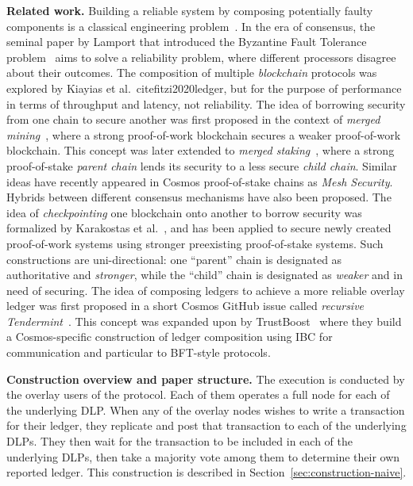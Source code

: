 \noindent
\textbf{Related work.} Building a reliable system by composing potentially faulty components
is a classical engineering problem~\cite{von1956probabilistic,moore1956reliable}.
In the era of consensus, the seminal
paper by Lamport that introduced the Byzantine Fault Tolerance problem~\cite{shostak1982byzantine}
aims to solve a reliability problem, where different processors disagree about their
outcomes. The composition of multiple \emph{blockchain} protocols was explored by
Kiayias et al.~cite{fitzi2020ledger}, but for the purpose of performance in terms of throughput
and latency, not reliability. The idea of borrowing security from one chain to
secure another was first proposed in the context of \emph{merged mining}~\cite{namecoin}, where
a strong proof-of-work blockchain secures a weaker proof-of-work blockchain. This
concept was later extended to \emph{merged staking}~\cite{pos-sidechains}, where a
strong proof-of-stake \emph{parent chain} lends its security to a less secure
\emph{child chain}. Similar ideas have recently appeared in Cosmos proof-of-stake
chains as \emph{Mesh Security}. Hybrids between different consensus mechanisms
have also been proposed. The idea of \emph{checkpointing}
one blockchain onto another to borrow security was formalized by Karakostas et al.~\cite{karakostas2021securing},
and has been applied to secure newly created proof-of-work systems using stronger
preexisting proof-of-stake systems. Such constructions are uni-directional:
one ``parent'' chain is designated as authoritative and \emph{stronger},
while the ``child'' chain is designated as \emph{weaker} and in need of securing.
The idea of composing ledgers to achieve a more reliable overlay ledger
was first proposed in a short Cosmos GitHub issue called
\emph{recursive Tendermint}~\cite{recursive-tendermint}.
This concept was expanded upon by TrustBoost~\cite{trustboost}
where they build a Cosmos-specific construction of ledger composition
using IBC for communication and particular to BFT-style protocols.

\noindent
\textbf{Construction overview and paper structure.}
The execution is conducted by the overlay users of the protocol.
Each of them operates a full node for each of the underlying DLP.
When any of the overlay nodes wishes to write a transaction for
their ledger, they replicate and post that transaction to each of
the underlying DLPs. They then wait for the transaction to be included
in each of the underlying DLPs, then take a majority vote among them
to determine their own reported ledger. This construction is described
in Section~\ref{sec:construction-naive}.

